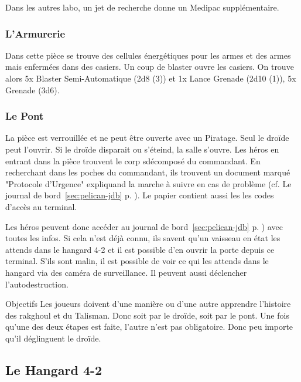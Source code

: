 \documentclass{jdrp}
\begin{document}
Dans les autres labo, un jet de recherche donne un Medipac supplémentaire.

\subsubsection{L'Armurerie}
Dans cette pièce se trouve des cellules énergétiques pour les armes et des armes mais enfermées dans des casiers. Un coup de blaster ouvre les casiers. On trouve alors 5x Blaster Semi-Automatique (2d8 (3)) et 1x Lance Grenade (2d10 (1)), 5x Grenade (3d6).


\subsubsection{Le Pont}
La pièce est verrouillée et ne peut être ouverte avec un Piratage. Seul le droïde peut l'ouvrir. Si le droïde disparait ou s'éteind, la salle s'ouvre. Les héros en entrant dans la pièce trouvent le corp sdécomposé du commandant. En recherchant dans les poches du commandant, ils trouvent un document marqué "Protocole d'Urgence" expliquand la marche à suivre en cas de problème (cf. Le journal de bord~\ref{sec:pelican-jdb} p. \pageref{sec:pelican-jdb}). Le papier contient aussi les les codes d'accès au terminal.

Les héros peuvent donc accéder au journal de bord~\ref{sec:pelican-jdb} p. \pageref{sec:pelican-jdb}) avec toutes les infos. Si cela n'est déjà connu, ils savent qu'un vaisseau en état les attends dans le hangard 4-2 et il est possible d'en ouvrir la porte depuis ce terminal. S'ils sont malin, il est possible de voir ce qui les attends dans le hangard via des caméra de surveillance. Il peuvent aussi déclencher l'autodestruction.

\begin{paperbox}{Objectifs}
Les joueurs doivent d'une manière ou d'une autre apprendre l'histoire des rakghoul et du Talisman. Donc soit par le droïde, soit par le pont. Une fois qu'une des deux étapes est faite, l'autre n'est pas obligatoire. Donc peu importe qu'il déglinguent le droïde.
\end{paperbox}

\subsection{Le Hangard 4-2}
\end{document}
